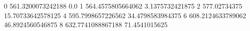0 561.3200073242188 0.0
1 564.4575805664062 3.1375732421875
2 577.02734375 15.70733642578125
4 595.7998657226562 34.4798583984375
6 608.2124633789062 46.8924560546875
8 632.7741088867188 71.4541015625
